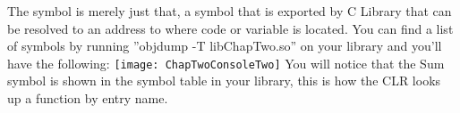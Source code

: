 The symbol is merely just that, a symbol that is exported by C Library that can be resolved to an address to where code or variable is located. You can find a list of symbols by running ''objdump -T libChapTwo.so'' on your library and you'll have the following:
\newline \newline
\texttt{[image: ChapTwoConsoleTwo]}
\newline\newline
You will notice that the Sum symbol is shown in the symbol table in your library, this is how the CLR looks up a function by entry name.